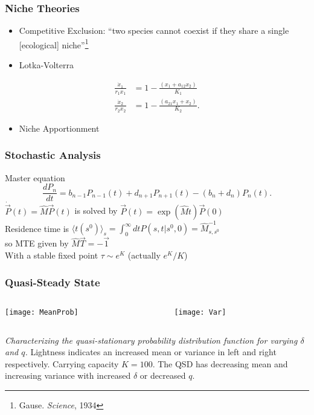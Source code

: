 \documentclass{beamer}
\begin{document}
\begin{frame}
\frametitle{Niche Theories}
\begin{itemize}
\item Competitive Exclusion: ``two species cannot coexist if they share a single [ecological] niche''\footnote{Gause. \emph{Science}, 1934}
\pause
\item Lotka-Volterra
\end{itemize}
\begin{align*}
\frac{\dot{x}_1}{r_1 x_1} &= 1 - \frac{(x_1 + a_{12}x_2)}{K_1} \\
\frac{\dot{x}_2}{r_2 x_2} &= 1 - \frac{(a_{21}x_1 + x_2)}{K_2}. 
\end{align*}
\pause
\begin{itemize}
\item Niche Apportionment
\end{itemize}
\end{frame}


\begin{frame}
\frametitle{Stochastic Analysis}
Master equation
\begin{equation*}
\frac{dP_n}{dt} =  b_{n-1}P_{n-1}(t) + d_{n+1}P_{n+1}(t) - (b_n+d_n)P_n(t).
\end{equation*}
\pause
$\dot{\vec{P}}(t) = \hat{M}\vec{P}(t)$ is solved by $\vec{P}(t)=\exp\left(\hat{M}t\right)\vec{P}(0)$ \\
\pause
Residence time is $\langle t(s^0)\rangle_s = \int_0^{\infty} dt P(s,t|s^0,0)=\hat{M}^{-1}_{s,s^0}$ \\
so MTE given by $\hat{M}\vec{T}=-\vec{1}$ \\
\pause
With a stable fixed point $\tau \sim e^K$ (actually $e^K/K$)
\end{frame}


\begin{frame}
\frametitle{Quasi-Steady State}
\begin{columns}
\begin{column}{5.5cm}
\begin{center}
\texttt{[image: MeanProb]}
\end{center}
\end{column}
\begin{column}{5.5cm}
\begin{center}
\texttt{[image: Var]}
\end{center}
\end{column}
\end{columns}
\justifying
\emph{Characterizing the quasi-stationary probability distribution function for varying $\delta$ and $q$.} 
Lightness indicates an increased mean or variance in left and right respectively. Carrying capacity $K=100$. 
The QSD has decreasing mean and increasing variance with increased $\delta$ or decreased $q$. 
\end{frame}
\end{document}

